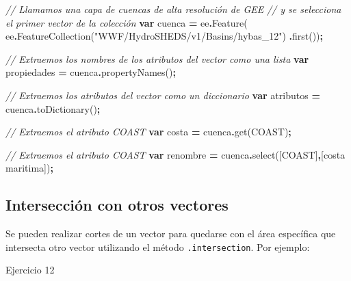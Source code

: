 \documentclass[
  12pt,
  letterpaper,
  twoside]{book}
\newenvironment{Shaded}{\begin{snugshade}}{\end{snugshade}}
\newcommand{\CommentTok}[1]{\textcolor[rgb]{0.56,0.35,0.01}{\textit{#1}}}
\newcommand{\FunctionTok}[1]{\textcolor[rgb]{0.00,0.00,0.00}{#1}}
\newcommand{\KeywordTok}[1]{\textcolor[rgb]{0.13,0.29,0.53}{\textbf{#1}}}
\newcommand{\NormalTok}[1]{#1}
\newcommand{\OperatorTok}[1]{\textcolor[rgb]{0.81,0.36,0.00}{\textbf{#1}}}
\newcommand{\StringTok}[1]{\textcolor[rgb]{0.31,0.60,0.02}{#1}}
\begin{document}
\begin{Shaded}
\begin{Highlighting}[]
\CommentTok{// Llamamos una capa de cuencas de alta resolución de GEE}
\CommentTok{// y se selecciona el primer vector de la colección}
\KeywordTok{var}\NormalTok{ cuenca }\OperatorTok{=}\NormalTok{ ee}\OperatorTok{.}\FunctionTok{Feature}\NormalTok{(}
\NormalTok{  ee}\OperatorTok{.}\FunctionTok{FeatureCollection}\NormalTok{(}\StringTok{"WWF/HydroSHEDS/v1/Basins/hybas\_12"}\NormalTok{)}
  \OperatorTok{.}\FunctionTok{first}\NormalTok{())}\OperatorTok{;}

\CommentTok{// Extraemos los nombres de los atributos del vector como una lista}
\KeywordTok{var}\NormalTok{ propiedades }\OperatorTok{=}\NormalTok{ cuenca}\OperatorTok{.}\FunctionTok{propertyNames}\NormalTok{()}\OperatorTok{;}

\CommentTok{// Extraemos los atributos del vector como un diccionario}
\KeywordTok{var}\NormalTok{ atributos }\OperatorTok{=}\NormalTok{ cuenca}\OperatorTok{.}\FunctionTok{toDictionary}\NormalTok{()}\OperatorTok{;}

\CommentTok{// Extraemos el atributo \textquotesingle{}COAST\textquotesingle{}}
\KeywordTok{var}\NormalTok{ costa }\OperatorTok{=}\NormalTok{ cuenca}\OperatorTok{.}\FunctionTok{get}\NormalTok{(}\StringTok{\textquotesingle{}COAST\textquotesingle{}}\NormalTok{)}\OperatorTok{;}

\CommentTok{// Extraemos el atributo \textquotesingle{}COAST\textquotesingle{}}
\KeywordTok{var}\NormalTok{ renombre }\OperatorTok{=}\NormalTok{ cuenca}\OperatorTok{.}\FunctionTok{select}\NormalTok{([}\StringTok{\textquotesingle{}COAST\textquotesingle{}}\NormalTok{]}\OperatorTok{,}\NormalTok{[}\StringTok{\textquotesingle{}costa maritima\textquotesingle{}}\NormalTok{])}\OperatorTok{;}
\end{Highlighting}
\end{Shaded}

\hypertarget{intersecciuxf3n-con-otros-vectores}{%
\subsection{Intersección con otros vectores}\label{intersecciuxf3n-con-otros-vectores}}

Se pueden realizar cortes de un vector para quedarse con el área específica que intersecta otro vector utilizando el método \texttt{.intersection}. Por ejemplo:

Ejercicio 12
\end{document}
